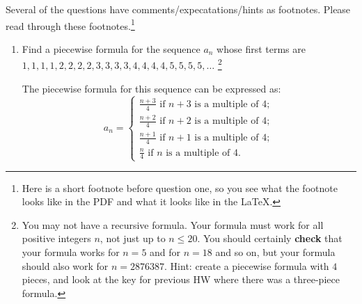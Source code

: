 \documentclass{article}
\begin{document}
\noindent Several of the questions have comments/expecatations/hints as footnotes. Please read through these footnotes.\footnote{Here is a short footnote before question one, so you see what the footnote looks like in the PDF and what it looks like in the LaTeX.}
\begin{enumerate}

    \item Find a piecewise formula for the sequence $a_n$ whose first terms are\vskip1pt
          $1,1,1,1,2,2,2,2,3,3,3,3,4,4,4,4,5,5,5,5,\dots$\vskip1pt \footnote{You may not
              have a recursive formula. Your formula must work for all positive integers $n$,
              not just up to $n \leq 20$. You should certainly {\bf check} that your formula
              works for $n=5$ and for $n=18$ and so on, but your formula should also work for
              $n=2876387$. Hint: create a piecewise formula with $4$ pieces, and look at the
              key for previous HW where there was a three-piece formula.}

          The piecewise formula for this sequence can be expressed as:
          \[
              a_n = \begin{cases}
                  \frac{n + 3}{4} \text{ if } n + 3 \text{ is a multiple of } 4; \\
                  \frac{n + 2}{4} \text{ if } n + 2 \text{ is a multiple of } 4; \\
                  \frac{n + 1}{4} \text{ if } n + 1 \text{ is a multiple of } 4; \\
                  \frac{n}{4} \text{ if } n \text{ is a multiple of } 4.
              \end{cases}
          \]

          \newpage


\end{enumerate}
\end{document}
